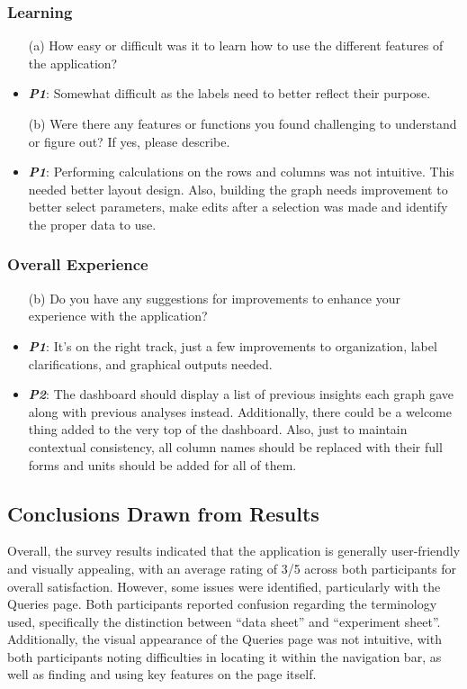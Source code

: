 \documentclass{article}
\begin{document}
\subsubsection{Learning}
\begin{itemize}
    \item[(a)] How easy or difficult was it to learn how to use the different
    features of the application?
    \item \textbf{\emph{P1}}: Somewhat difficult as the labels need to better
    reflect their purpose.
    \item[(b)] Were there any features or functions you found challenging to
    understand or figure out? If yes, please describe. 
    \item \textbf{\emph{P1}}: Performing calculations on the rows and columns
    was not intuitive. This needed  better layout design. Also, building the
    graph needs improvement to better select parameters, make edits after a
    selection was made and identify the proper data to use.
\end{itemize}

\subsubsection{Overall Experience}
\begin{itemize}
    \item[(b)] Do you have any suggestions for improvements to enhance your
    experience with the application?
    \item \textbf{\emph{P1}}: It’s on the right track, just a few improvements
    to organization, label clarifications, and graphical outputs needed.
    \item \textbf{\emph{P2}}: The dashboard should display a list of previous
    insights each graph gave along with previous analyses instead. Additionally,
    there could be a welcome thing added to the very top of the dashboard. Also,
    just to maintain contextual consistency, all column names should be replaced
    with their full forms and units should be added for all of them.
\end{itemize}

\subsection{Conclusions Drawn from Results}
Overall, the survey results indicated that the application is generally
user-friendly and visually appealing, with an average rating of 3/5 across both
participants for overall satisfaction.
However, some issues were identified, particularly with the Queries page. Both
participants reported confusion regarding the terminology used, specifically the
distinction between ``data sheet'' and ``experiment sheet''. Additionally, the
visual appearance of the Queries page was not intuitive, with both participants
noting difficulties in locating it within the navigation bar, as well as finding
and using key features on the page itself.
\end{document}
